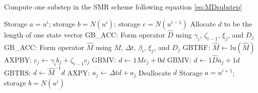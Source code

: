 \documentclass[letterpaper,reqno,11pt]{amsart}
\begin{document}
%
\begin{algorithm}
\caption{Compute one substep in the SMR scheme following
         equation \eqref{eq:MDsubstep}}
\label{alg:substep}
\begin{algorithmic}
  \REQUIRE Storage $a = u^i$;
           storage $b = N\left(u^{i}\right)$;
           storage $c = N\left(u^{i-1}\right)$
  \STATE Allocate $d$ to be the length of one state vector
  \STATE GB\_ACC: Form operator $\hat{D}$ using $\gamma_i$, $\zeta_{i-1}$,
         $\xi_j$, and $D_j$
  \STATE GB\_ACC: Form operator $\hat{M}$ using $M$, $\Delta{}t$, $\beta_i$,
         $\xi_j$, and $D_j$
  \STATE GBTRF:  $\hat{M}\leftarrow{}\mbox{lu}\left( \hat{M} \right)$
    \STATE AXPBY: $c_{j}\leftarrow{}\gamma_{i}b_{j}+\zeta_{i-1}c_{j}$
    \STATE GBMV: $d\leftarrow{}1 M c_{j} + 0 d$
    \STATE GBMV: $d\leftarrow{}1 \hat{D} a_{j} + 1 d$
    \STATE GBTRS: $d\leftarrow{}\hat{M}^{-1} d$
    \STATE AXPY: $a_{j}\leftarrow{}\Delta{}t d + a_{j}$
  \ENDFOR
  \STATE Deallocate $d$
  \ENSURE Storage $a = u^{i+1}$;
          storage $b = N\left(u^{i}\right)$
\end{algorithmic}
\end{algorithm}
\end{document}
